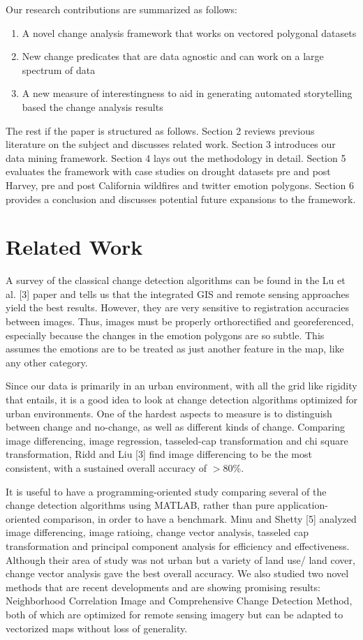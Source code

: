 \documentclass[conference]{IEEEtran}
\begin{document}
Our research contributions are summarized as follows:

\begin{enumerate}
 \item A novel change analysis framework that works on vectored polygonal datasets
 \item New change predicates that are data agnostic and can work on a large spectrum of data
 \item A new measure of interestingness to aid in generating automated storytelling based the change analysis results
\end{enumerate}

The rest if the paper is structured as follows. Section 2 reviews previous literature on the subject and discusses related work.  Section 3 introduces our data mining framework. Section 4 lays out the methodology in detail. Section 5 evaluates the framework with case studies on drought datasets pre and post Harvey, pre and post California wildfires and twitter emotion polygons. Section 6 provides a conclusion and discusses potential future expansions to the framework.


\section{Related Work}

A survey of the classical change detection algorithms can be found in the Lu et al. [3] paper and tells us that the integrated GIS and remote sensing approaches yield the best results. However, they are very sensitive to registration accuracies between images. Thus, images must be properly orthorectified and georeferenced, especially because the changes in the emotion polygons are so subtle. This assumes the emotions are to be treated as just another feature in the map, like any other category.

Since our data is primarily in an urban environment, with all the grid like rigidity that entails, it is a good idea to look at change detection algorithms optimized for urban environments. One of the hardest aspects to measure is to distinguish between change and no-change, as well as different kinds of change. Comparing image differencing, image regression, tasseled-cap transformation and chi square transformation, Ridd and Liu [3] find image differencing to be the most consistent, with a sustained overall accuracy of 
$>$80\%.

It is useful to have a programming-oriented study comparing several of the change detection algorithms using MATLAB, rather than pure application-oriented comparison, in order to have a benchmark. Minu and Shetty [5] analyzed image differencing, image ratioing, change vector analysis, tasseled cap transformation and principal component analysis for efficiency and effectiveness. Although their area of study was not urban but a variety of land use/ land cover, change vector analysis gave the best overall accuracy.
We also studied two novel methods that are recent developments and are showing promising results: Neighborhood Correlation Image and Comprehensive Change Detection Method, both of which are optimized for remote sensing imagery but can be adapted to vectorized maps without loss of generality.
\end{document}

